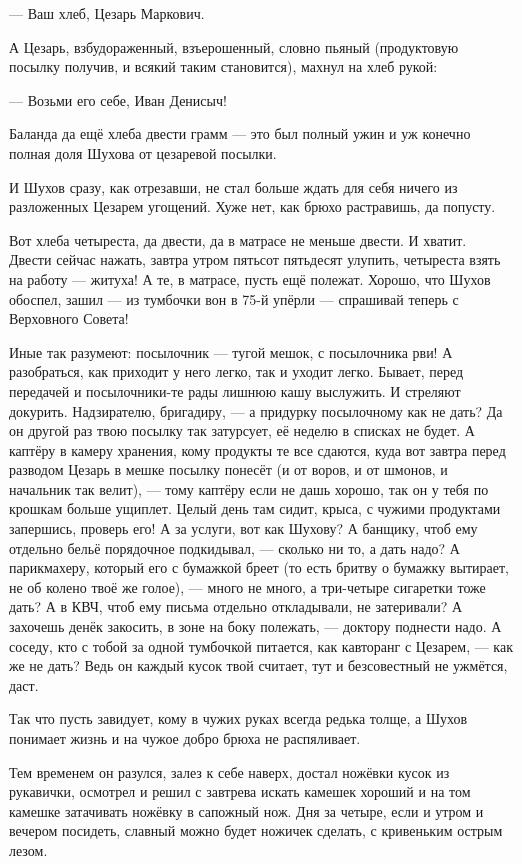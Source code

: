 --- Ваш хлеб, Цезарь Маркович.

А Цезарь, взбудораженный, взъерошенный, словно пьяный (продуктовую посылку получив, и всякий 
таким становится), махнул на хлеб рукой:

--- Возьми его себе, Иван Денисыч!

Баланда да ещё хлеба двести грамм --- это был полный ужин и уж конечно полная доля Шухова от 
цезаревой посылки.

И Шухов сразу, как отрезавши, не стал больше ждать для себя ничего из разложенных Цезарем 
угощений. Хуже нет, как брюхо растравишь, да попусту.

Вот хлеба четыреста, да двести, да в матрасе не меньше двести. И хватит. Двести сейчас нажать, 
завтра утром пятьсот пятьдесят улупить, четыреста взять на работу --- житуха! А те, в матрасе, 
пусть ещё полежат. Хорошо, что Шухов обоспел, зашил --- из тумбочки вон в 75-й упёрли --- 
спрашивай теперь с Верховного Совета!

Иные так разумеют: посылочник --- тугой мешок, с посылочника рви! А разобраться, как приходит у 
него легко, так и уходит легко. Бывает, перед передачей и посылочники-те рады лишнюю кашу 
выслужить. И стреляют докурить. Надзирателю, бригадиру, --- а придурку посылочному как не 
дать? Да он другой раз твою посылку так затурсует, её неделю в списках не будет. А каптёру в 
камеру хранения, кому продукты те все сдаются, куда вот завтра перед разводом Цезарь в мешке 
посылку понесёт (и от воров, и от шмонов, и начальник так велит), --- тому каптёру если не дашь 
хорошо, так он у тебя по крошкам больше ущиплет. Целый день там сидит, крыса, с чужими 
продуктами запершись, проверь его! А за услуги, вот как Шухову? А банщику, чтоб ему отдельно 
бельё порядочное подкидывал, --- сколько ни то, а дать надо? А парикмахеру, который его с 
бумажкой бреет (то есть бритву о бумажку вытирает, не об колено твоё же голое), --- много не 
много, а три-четыре сигаретки тоже дать? А в КВЧ, чтоб ему письма отдельно откладывали, не 
затеривали? А захочешь денёк закосить, в зоне на боку полежать, --- доктору поднести надо. А 
соседу, кто с тобой за одной тумбочкой питается, как кавторанг с Цезарем, --- как же не дать? 
Ведь он каждый кусок твой считает, тут и безсовестный не ужмётся, даст.

Так что пусть завидует, кому в чужих руках всегда редька толще, а Шухов понимает жизнь и на 
чужое добро брюха не распяливает.

Тем временем он разулся, залез к себе наверх, достал ножёвки кусок из рукавички, осмотрел и 
решил с завтрева искать камешек хороший и на том камешке затачивать ножёвку в сапожный нож. 
Дня за четыре, если и утром и вечером посидеть, славный можно будет ножичек сделать, с 
кривеньким острым лезом.

